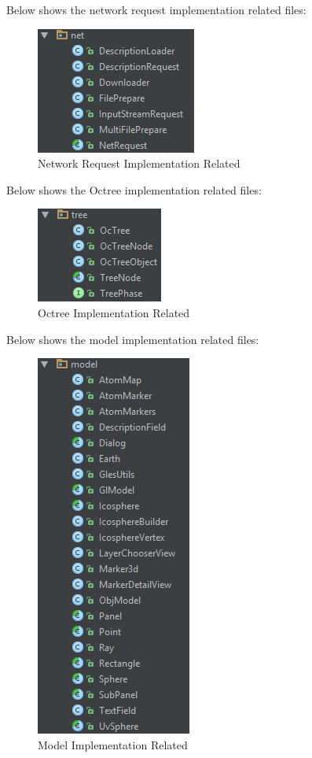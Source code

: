 Below shows the network request implementation related files:

\begin{figure}[H]
\caption{Network Request Implementation Related}
\label{fig:files-net}
\centering
\includegraphics[]{Figures/files-net.png}
\decoRule
\end{figure}

Below shows the Octree implementation related files:

\begin{figure}[H]
\caption{Octree Implementation Related}
\label{fig:files-octree}
\centering
\includegraphics[]{Figures/files-octree.png}
\decoRule
\end{figure}

Below shows the model implementation related files:

\begin{figure}[H]
\caption{Model Implementation Related}
\label{fig:files-model}
\centering
\includegraphics[]{Figures/files-model.png}
\decoRule
\end{figure}

